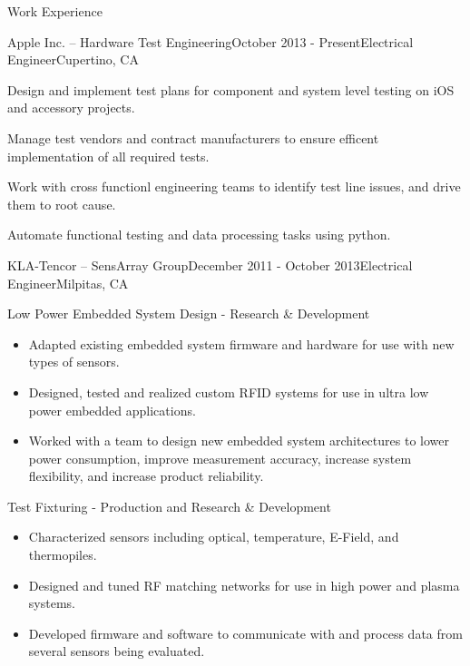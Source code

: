 \documentclass{resume} %
\begin{document}
\vspace{0.5em}
\begin{rSection}{Work Experience}
\vspace{-0.5em}
\begin{rSubsection}{Apple Inc. -- Hardware Test Engineering}{October 2013 - Present}{Electrical Engineer}{Cupertino, CA}
\item Design and implement test plans for component and system level testing on iOS and accessory projects.
\item Manage test vendors and contract manufacturers to ensure efficent implementation of all required tests.
\item Work with cross functionl engineering teams to identify test line issues, and drive them to root cause.
\item Automate functional testing and data processing tasks using python.
\end{rSubsection}


\ssquish
\begin{rSubsection2}{KLA-Tencor -- SensArray Group}{December 2011 - October 2013}{Electrical Engineer}{Milpitas, CA}
\item Low Power Embedded System Design - Research \& Development 
\begin{itemize}
\itemsep -0.5em \vspace{-0.5em}
\renewcommand{\labelitemi}{-}
\item Adapted existing embedded system firmware and hardware for use with new types of sensors.
\item Designed, tested and realized custom RFID systems for use in ultra low power embedded applications.
\item Worked with a team to design new embedded system architectures to lower power consumption, improve measurement accuracy, increase system flexibility, and increase product reliability.
\end{itemize}

\ssquish
\item Test Fixturing - Production and Research \& Development
\begin{itemize}
\itemsep -0.5em \vspace{-0.5em}
\renewcommand{\labelitemi}{-}
\item Characterized sensors including optical, temperature, E-Field, and thermopiles.
\item Designed and tuned RF matching networks for use in high power and plasma systems.
\item Developed firmware and software to communicate with and process data from several sensors being evaluated.
\end{itemize}
\end{rSubsection2}


\end{rSection}
\end{document}
